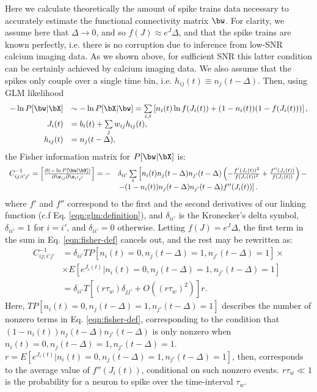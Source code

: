 Here we calculate theoretically the amount of spike trains data necessary to accurately estimate the functional connectivity matrix $\bw$. For clarity, we assume here that $\Delta \rightarrow 0$, and so $f(J)\approx e^J\Delta$, and that the spike trains are known perfectly, i.e. there is no corruption due to inference from low-SNR calcium imaging data.
As we shown above, for sufficient SNR this latter condition can be certainly achieved by calcium imaging data.
We also assume that the spikes only couple over a single time bin, i.e. $h_{ij}(t)\equiv n_j(t-\Delta)$.
Then, using GLM likelihood
\begin{equation}\label{eqn:fisher-glm}
\begin{array}{rl}
-\ln P[\bw | \bX] &\sim -\ln P[\bX | \bw] =
\sum\limits_{i,t} \left[ n_i(t) \ln f(J_i(t)) + (1-n_i(t)) (1-f(J_i(t))) \right], \\
J_i(t) &= b_i(t) + \sum\limits_j w_{ij} h_{ij}(t), \\
h_{ij}(t) &= n_j(t-\Delta),
\end{array}
\end{equation}
the Fisher information matrix for $P[\bw | \bX]$ is:
\begin{equation}\label{eqn:fisher-def}
\begin{array}{rl}
C^{-1}_{ij;i'j'}=\left[\frac{\partial (-\ln P[\bw | \bX])}{\partial \w_{ij}\partial \w_{i'j'}}\right]
=-&\delta_{ii'}\sum\limits_t\left[
n_i(t)n_{j}(t-\Delta)n_{j'}(t-\Delta)\left(-\frac{f'(J_i(t))^2}{f(J_i(t))^2} +
\frac{f''(J_i(t))}{f(J_i(t))}\right) - \right. \\
&\left.-(1-n_i(t))n_{j}(t-\Delta)n_{j'}(t-\Delta)f''(J_i(t))\right].
\end{array}
\end{equation}
where $f'$ and $f''$ correspond to the first and the second derivatives of our linking function (c.f Eq. \ref{eqn:glm:definition}), and $\delta_{ii'}$ is
the Kronecker's delta symbol, $\delta_{ii'}=1$ for $i=i'$, and $\delta_{ii'}=0$ otherwise.  Letting $f(J)=e^J\Delta$, the first term in the sum in Eq. \ref{eqn:fisher-def} cancels out, and the rest may be rewritten as:
\begin{equation}\label{eqn:fisher}
\begin{array}{rl}
C^{-1}_{ij;i'j'}
&=\delta_{ii'} T P[n_i(t)=0, n_j(t-\Delta)=1, n_{j'}(t-\Delta)=1]\times \\
&\times E[e^{J_i(t)}|n_i(t)=0, n_j(t-\Delta)=1, n_{j'}(t-\Delta)=1] \\
&= \delta_{ii'}T\left[(r \tau_w)\delta_{jj'}+O((r \tau_w)^2)\right]r.
\end{array}
\end{equation}
Here, $TP[n_i(t)=0, n_j(t-\Delta)=1, n_{j'}(t-\Delta)=1]$ describes the number of nonzero
terms in Eq. \ref{eqn:fisher-def}, corresponding to the condition that
$(1-n_i(t))n_{j}(t-\Delta)n_{j'}(t-\Delta)$ is only nonzero when
$n_i(t)=0, n_j(t-\Delta)=1, n_{j'}(t-\Delta)=1$.
$r=E[e^{J_i(t)}|n_i(t)=0, n_j(t-\Delta)=1, n_{j'}(t-\Delta)=1]$, then,
corresponds to the average value of $f''(J_i(t))$, conditional on such nonzero events.
$r\tau_w \ll 1$ is the probability for a neuron to spike over the time-interval  $\tau_w$.

